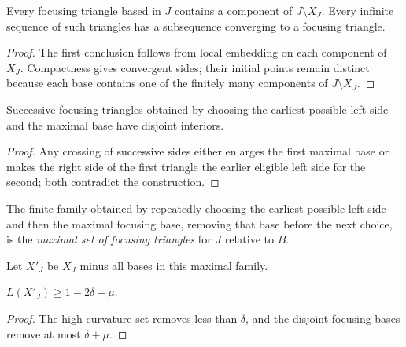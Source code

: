 \begin{claim}
\label{claim:focusing-triangle-limit-existence}
\label{limittri}
Every focusing triangle based in $J$ contains a component of $J\setminus X_J$.
Every infinite sequence of such triangles has a subsequence converging to a
focusing triangle.
\end{claim}
\begin{proof}
\sketch The first conclusion follows from local embedding on each component of $X_J$.
Compactness gives convergent sides; their initial points remain distinct because
each base contains one of the finitely many components of $J\setminus X_J$.
\end{proof}

\begin{claim}
\label{claim:maximal-focusing-triangles-disjoint}
Successive focusing triangles obtained by choosing the earliest possible left
side and the maximal base have disjoint interiors.
\end{claim}
\begin{proof}
\sketch Any crossing of successive sides either enlarges the first maximal base
or makes the right side of the first triangle the earlier eligible left side
for the second; both contradict the construction.
\end{proof}

\begin{definition}
\label{def:maximal-focusing-triangle-set}
The finite family obtained by repeatedly choosing the earliest possible left
side and then the maximal focusing base, removing that base before the next
choice, is the \emph{maximal set of focusing triangles} for $J$ relative to
$B$.
\end{definition}

Let $X'_J$ be $X_J$ minus all bases in this maximal family.

\begin{claim}
\label{claim:remaining-set-length-bound}
$L(X'_J)\ge1-2\delta-\mu$.
\end{claim}
\begin{proof}
\sketch The high-curvature set removes less than $\delta$, and the disjoint focusing
bases remove at most $\delta+\mu$.
\end{proof}

